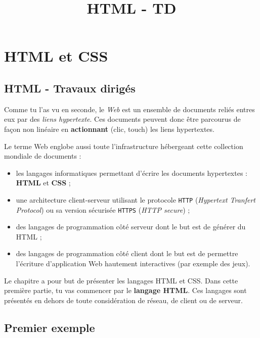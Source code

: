 \documentclass[a4paper,17pt]{extarticle}
\title{HTML - TD}
\providecommand{\tightlist}{%
      \setlength{\itemsep}{0pt}\setlength{\parskip}{0pt}}
\begin{document}
    
    
    

    
    

    
    \hypertarget{html-et-css}{%
\section{HTML et CSS}\label{html-et-css}}

\hypertarget{html---travaux-diriguxe9s}{%
\subsection{HTML - Travaux dirigés}\label{html---travaux-diriguxe9s}}

    Comme tu l'as vu en seconde, le \emph{Web} est un ensemble de documents
reliés entres eux par des \emph{liens hypertexte}. Ces documents peuvent
donc être parcourus de façon non linéaire en \textbf{actionnant} (clic,
touch) les liens hypertextes.

Le terme Web englobe aussi toute l'infrastructure hébergeant cette
collection mondiale de documents :

\begin{itemize}
\tightlist
\item
  les langages informatiques permettant d'écrire les documents
  hypertextes : \textbf{HTML} et \textbf{CSS} ;
\item
  une architecture client-serveur utilisant le protocole \texttt{HTTP}
  (\emph{Hypertext Tranfert Protocol}) ou sa version sécurisée
  \texttt{HTTPS} (\emph{HTTP secure}) ;
\item
  des langages de programmation côté serveur dont le but est de générer
  du HTML ;
\item
  des langages de programmation côté client dont le but est de permettre
  l'écriture d'application Web hautement interactives (par exemple des
  jeux).
\end{itemize}
\begin{remarque}
    Le chapitre a pour but de présenter les langages HTML et CSS. Dans cette
première partie, tu vas commencer par le \textbf{langage HTML}. Ces
langages sont présentés en dehors de toute considération de réseau, de
client ou de serveur.

            \end{remarque}
    \hypertarget{premier-exemple}{%
\subsection{Premier exemple}\label{premier-exemple}}
\end{document}
